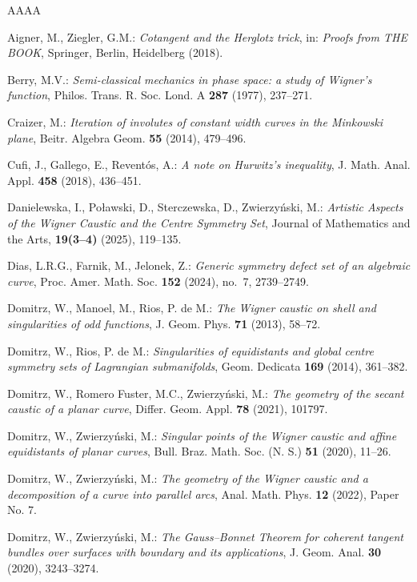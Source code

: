 \documentclass{amsart}
\theoremstyle{definition}
\numberwithin{equation}{section}
\begin{document}

\begin{thebibliography}{AAAA}

 Aigner, M., Ziegler, G.M.: \emph{Cotangent and the Herglotz trick}, in: \emph{Proofs from THE BOOK}, Springer, Berlin, Heidelberg (2018).

 Berry, M.V.: \emph{Semi-classical mechanics in phase space: a study of Wigner's function},
Philos. Trans. R. Soc. Lond. A \textbf{287} (1977), 237--271. 

 Craizer, M.: \emph{Iteration of involutes of constant width curves in the Minkowski plane}, Beitr. Algebra Geom. \textbf{55} (2014), 479--496.

  Cufi, J., Gallego, E., Revent\'os, A.: \emph{A note on Hurwitz's inequality},
J. Math. Anal. Appl. \textbf{458} (2018), 436--451.

 Danielewska, I., Poławski, D., Sterczewska, D., Zwierzy\'nski, M.: \emph{Artistic Aspects of the Wigner Caustic and the Centre Symmetry Set}, Journal of Mathematics and the Arts, \textbf{19(3--4)} (2025), 119--135.

 Dias, L.R.G., Farnik, M., Jelonek, Z.: \emph{Generic symmetry defect set of an algebraic curve},
Proc. Amer. Math. Soc. \textbf{152} (2024), no.~7, 2739--2749.

 Domitrz, W., Manoel, M., Rios, P. de M.: \emph{The Wigner caustic on shell and singularities of odd functions}, J. Geom. Phys. \textbf{71} (2013), 58--72.

 Domitrz, W., Rios, P. de M.: \emph{Singularities of equidistants and global centre symmetry sets of Lagrangian submanifolds},
Geom. Dedicata \textbf{169} (2014), 361--382.

 Domitrz, W., Romero Fuster, M.C., Zwierzy\'nski, M.: \emph{The geometry of the secant caustic of a planar curve},
Differ. Geom. Appl. \textbf{78} (2021), 101797.

 Domitrz, W., Zwierzy\'nski, M.: \emph{Singular points of the Wigner caustic and affine equidistants of planar curves},
Bull. Braz. Math. Soc. (N. S.) \textbf{51} (2020), 11--26.

 Domitrz, W., Zwierzy\'nski, M.: \emph{The geometry of the Wigner caustic and a decomposition of a curve into parallel arcs},
Anal. Math. Phys. \textbf{12} (2022), Paper No. 7.

 Domitrz, W., Zwierzy\'nski, M.: \emph{The Gauss--Bonnet Theorem for coherent tangent bundles over surfaces with boundary and its applications}, J. Geom. Anal. \textbf{30} (2020), 3243--3274.


\end{thebibliography}
\end{document}

